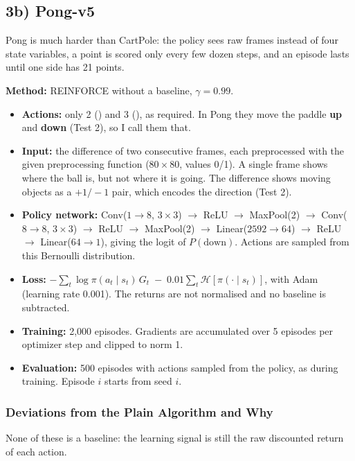 \FloatBarrier
\subsection{3b) Pong-v5}

Pong is much harder than CartPole: the policy sees raw frames instead of four state variables, a point is scored only every few dozen steps, and an episode lasts until one side has 21 points.

\textbf{Method:} REINFORCE without a baseline, $\gamma = 0.99$.
\begin{itemize}
  \item \textbf{Actions:} only 2 () and 3 (), as required. In Pong they move the paddle \textbf{up} and \textbf{down} (Test 2), so I call them that.
  \item \textbf{Input:} the difference of two consecutive frames, each preprocessed with the given preprocessing function ($80 \times 80$, values 0/1). A single frame shows where the ball is, but not where it is going. The difference shows moving objects as a $+1/-1$ pair, which encodes the direction (Test 2).
  \item \textbf{Policy network:} Conv($1 \to 8$, $3 \times 3$) $\to$ ReLU $\to$ MaxPool(2) $\to$ Conv($8 \to 8$, $3 \times 3$) $\to$ ReLU $\to$ MaxPool(2) $\to$ Linear($2592 \to 64$) $\to$ ReLU $\to$ Linear($64 \to 1$), giving the logit of $P(\text{down})$. Actions are sampled from this Bernoulli distribution.
  \item \textbf{Loss:} $-\sum_t \log \pi(a_t \mid s_t)\, G_t \;-\; 0.01 \sum_t \mathcal{H}[\pi(\cdot \mid s_t)]$, with Adam (learning rate 0.001). The returns are not normalised and no baseline is subtracted.
  \item \textbf{Training:} 2,000 episodes. Gradients are accumulated over 5 episodes per optimizer step and clipped to norm 1.
  \item \textbf{Evaluation:} 500 episodes with actions sampled from the policy, as during training. Episode $i$ starts from seed $i$.
\end{itemize}

\subsubsection{Deviations from the Plain Algorithm and Why}

None of these is a baseline: the learning signal is still the raw discounted return of each action.

